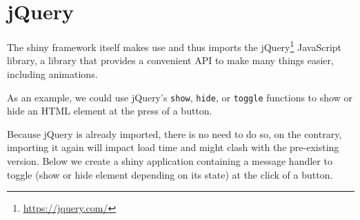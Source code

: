 \documentclass[10pt,]{krantz}
\makeatletter
\newenvironment{Shaded}{\begin{snugshade}}{\end{snugshade}}
\newcommand{\AttributeTok}[1]{\textcolor[rgb]{0.61,0.61,0.61}{#1}}
\newcommand{\CommentTok}[1]{\textcolor[rgb]{0.37,0.37,0.37}{\textit{#1}}}
\newcommand{\ControlFlowTok}[1]{\textcolor[rgb]{0.27,0.27,0.27}{\textbf{#1}}}
\newcommand{\DataTypeTok}[1]{\textcolor[rgb]{0.27,0.27,0.27}{#1}}
\newcommand{\KeywordTok}[1]{\textcolor[rgb]{0.27,0.27,0.27}{\textbf{#1}}}
\newcommand{\NormalTok}[1]{#1}
\newcommand{\OperatorTok}[1]{\textcolor[rgb]{0.43,0.43,0.43}{\textbf{#1}}}
\newcommand{\StringTok}[1]{\textcolor[rgb]{0.5,0.5,0.5}{#1}}
\renewcommand{\href}[2]{#2\footnote{\url{#1}}}
\newenvironment{kframe}{%
\medskip{}
\setlength{\fboxsep}{.8em}
 \def\at@end@of@kframe{}%
 \ifinner\ifhmode%
  \def\at@end@of@kframe{\end{minipage}}%
  \begin{minipage}{\columnwidth}%
 \fi\fi%
 \def\FrameCommand##1{\hskip\@totalleftmargin \hskip-\fboxsep
 \colorbox{shadecolor}{##1}\hskip-\fboxsep
     \hskip-\linewidth \hskip-\@totalleftmargin \hskip\columnwidth}%
 \MakeFramed {\advance\hsize-\width
   \@totalleftmargin\z@ \linewidth\hsize
   \@setminipage}}%
 {\par\unskip\endMakeFramed%
 \at@end@of@kframe}
\renewenvironment{Shaded}{\begin{kframe}}{\end{kframe}}
\makeatother
\begin{document}
\hypertarget{shiny-tips-jQuery}{%
\section{jQuery}\label{shiny-tips-jQuery}}

The shiny framework itself makes use and thus imports the \href{https://jquery.com/}{jQuery} JavaScript library, a library that provides a convenient API to make many things easier, including animations.

As an example, we could use jQuery's \texttt{show}, \texttt{hide}, or \texttt{toggle} functions to show or hide an HTML element at the press of a button.

\begin{Shaded}
\end{Shaded}

Because jQuery is already imported, there is no need to do so, on the contrary, importing it again will impact load time and might clash with the pre-existing version. Below we create a shiny application containing a message handler to toggle (show or hide element depending on its state) at the click of a button.

\begin{Shaded}
\end{Shaded}
\end{document}

